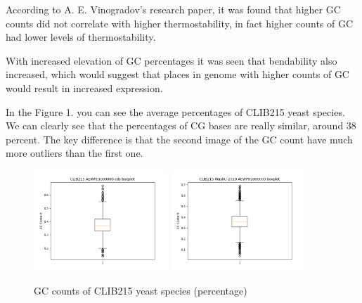 According to A. E. Vinogradov's research paper, it was found that higher GC counts did not correlate with higher thermostability, in fact higher counts of GC had lower levels of thermostability.

With increased elevation of GC percentages it was seen that bendability also increased, which would suggest that places in genome with higher counts of GC would result in increased expression.

In the Figure 1. you can see the average percentages of CLIB215 yeast species. We can clearly see that the percentages of CG bases are really similar, around 38 percent. The key difference is that the second image of the GC count have much more outliers than the first one.
\begin{figure}[htbp]
  \centering
  \includegraphics[width=0.45\textwidth]{images/CLIB215_AEWP01000000_cds_boxplot.png}
  \hfill
  \includegraphics[width=0.45\textwidth]{images/CLIB215_WashU_2010_AEWP01000000_boxplot.png}
  \caption{GC counts of CLIB215 yeast species (percentage)}
  \label{fig:combined-images}
\end{figure}

